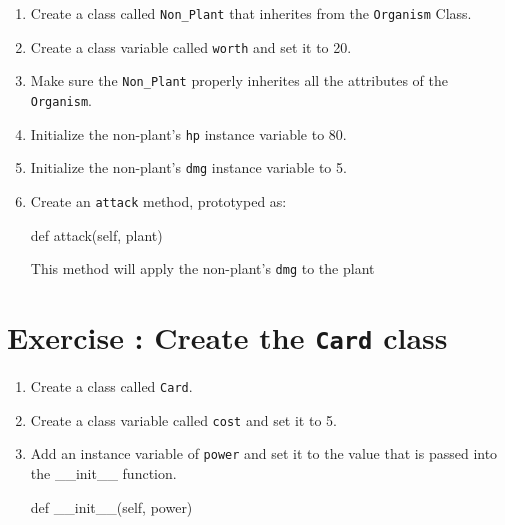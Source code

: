 \documentclass{42-en}
\begin{document}
   \begin{enumerate}\itemsep7pt
    \item Create a class called \texttt{Non\_Plant} that inherites from the \texttt{Organism} Class.
    \item Create a class variable called \texttt{worth} and set it to 20.
    \item Make sure the \texttt{Non\_Plant} properly inherites all the attributes of the \texttt{Organism}.
    \item Initialize the non-plant's \texttt{hp} instance variable to 80.
    \item Initialize the non-plant's \texttt{dmg} instance variable to 5.
    \item Create an \texttt{attack} method, prototyped as:
\begin{42pycode}
def attack(self, plant)
\end{42pycode}
This method will apply the non-plant's \texttt {dmg} to the plant
\end{enumerate}
\nextexercice
\chapter{Exercise \exercicenumber: Create the \texttt{Card} class}

\exnumber{\exercicenumber}

\makeheaderfiles

   \begin{enumerate}\itemsep7pt
    \item Create a class called \texttt{Card}.
    \item Create a class variable called \texttt{cost} and set it to 5.
    \item Add an instance variable of \texttt{power} and set it to the value that is passed into the \_\_init\_\_ function.
\begin{42pycode}
def __init__(self, power)
\end{42pycode}
\end{enumerate}
\nextexercice
\end{document}
